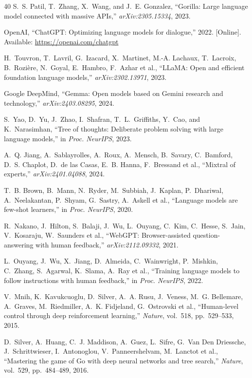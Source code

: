 \documentclass[journal,twocolumn,letterpaper]{IEEEtran}
\begin{document}
\begin{thebibliography}{40}
S.~S. Patil, T.~Zhang, X.~Wang, and J.~E. Gonzalez, ``Gorilla: Large language
  model connected with massive APIs,'' \emph{arXiv:2305.15334}, 2023.

OpenAI, ``ChatGPT: Optimizing language models for dialogue,'' 2022.
  [Online]. Available: \url{https://openai.com/chatgpt}

H.~Touvron, T.~Lavril, G.~Izacard, X.~Martinet, M.-A. Lachaux,
  T.~Lacroix, B.~Rozi\`{e}re, N.~Goyal, E.~Hambro, F.~Azhar et al.,
  ``LLaMA: Open and efficient foundation language models,''
  \emph{arXiv:2302.13971}, 2023.

Google DeepMind, ``Gemma: Open models based on Gemini research and
  technology,'' \emph{arXiv:2403.08295}, 2024.

S.~Yao, D.~Yu, J.~Zhao, I.~Shafran, T.~L.~Griffiths, Y.~Cao, and
  K.~Narasimhan, ``Tree of thoughts: Deliberate problem solving with
  large language models,'' in \emph{Proc. NeurIPS}, 2023.

A.~Q. Jiang, A.~Sablayrolles, A.~Roux, A.~Mensch, B.~Savary, C.~Bamford,
  D.~S. Chaplot, D.~de las Casas, E.~B. Hanna, F.~Bressand et al.,
  ``Mixtral of experts,'' \emph{arXiv:2401.04088}, 2024.

T.~B. Brown, B.~Mann, N.~Ryder, M.~Subbiah, J.~Kaplan, P.~Dhariwal,
  A.~Neelakantan, P.~Shyam, G.~Sastry, A.~Askell et al.,
  ``Language models are few-shot learners,'' in \emph{Proc. NeurIPS}, 2020.

R.~Nakano, J.~Hilton, S.~Balaji, J.~Wu, L.~Ouyang, C.~Kim, C.~Hesse,
  S.~Jain, V.~Kosaraju, W.~Saunders et al., ``WebGPT: Browser-assisted
  question-answering with human feedback,'' \emph{arXiv:2112.09332}, 2021.

L.~Ouyang, J.~Wu, X.~Jiang, D.~Almeida, C.~Wainwright, P.~Mishkin, C.~Zhang,
  S.~Agarwal, K.~Slama, A.~Ray et al., ``Training language models to follow
  instructions with human feedback,'' in \emph{Proc. NeurIPS}, 2022.

V.~Mnih, K.~Kavukcuoglu, D.~Silver, A.~A. Rusu, J.~Veness, M.~G. Bellemare,
  A.~Graves, M.~Riedmiller, A.~K. Fidjeland, G.~Ostrovski et al.,
  ``Human-level control through deep reinforcement learning,''
  \emph{Nature}, vol.~518, pp.~529--533, 2015.

D.~Silver, A.~Huang, C.~J. Maddison, A.~Guez, L.~Sifre, G.~Van Den
  Driessche, J.~Schrittwieser, I.~Antonoglou, V.~Panneershelvam,
  M.~Lanctot et al., ``Mastering the game of Go with deep neural networks and
  tree search,'' \emph{Nature}, vol.~529, pp.~484--489, 2016.


\end{thebibliography}
\end{document}

